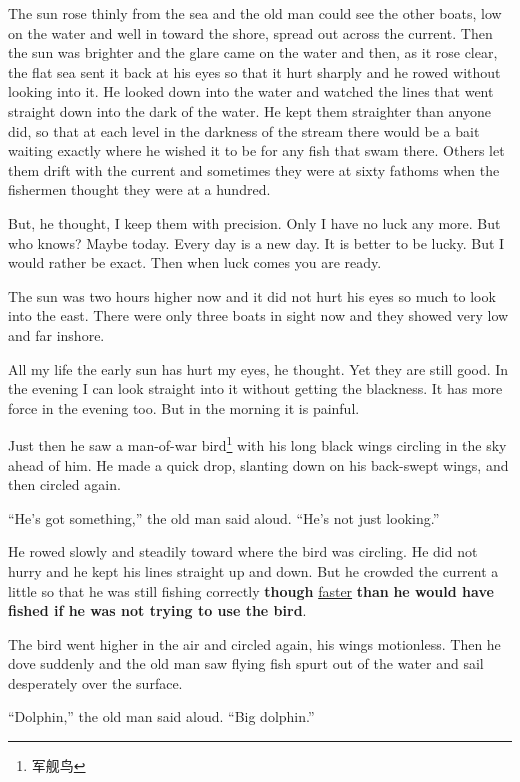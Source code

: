 \documentclass[fontset=ubuntu]{ctexrep}
\newlength{\drop}%
\begin{document}
The sun rose \gls{thinly} from the sea and the old man could see the other boats,
low on the water and well in \gls{toward} the \gls{shore}, spread out across the
current. Then the sun was brighter and the \gls{glare} came on the water and
then, as it rose clear, the \gls{flat} sea sent it back at his eyes so that it
hurt \gls{sharply} and he rowed without looking into it. He looked down into the
water and watched the lines that went straight down into the dark of the
water. He kept them straighter than anyone did, so that at each level in
the darkness of the stream there would be a bait waiting exactly where he
wished it to be for any fish that swam there. Others let them drift with
the current and sometimes they were at sixty fathoms when the fishermen
thought they were at a hundred.

But, he thought, I keep them with \gls{precision}. Only I have no luck any more.
But who knows? Maybe today. Every day is a new day. It is better to be
lucky. But I would rather be exact. Then when luck comes you are ready.

The sun was two hours higher now and it did not hurt his eyes so much to
look into the east. There were only three boats in \gls{sight} now and they
showed very low and far \gls{inshore}.

All my life the early sun has hurt my eyes, he thought. Yet they are still
good. In the evening I can look straight into it without getting the
blackness. It has more \gls{force} in the evening too. But in the morning it is
\gls{painful}.

Just then he saw a man-of-war bird\footnote{军舰鸟} with his long black
wings circling in the sky \gls{ahead} of him. He made a quick drop,
\gls{slanting} down on his back-swept wings, and then circled again.

``He's got something,'' the old man said aloud. ``He's not just looking.''

He rowed slowly and steadily toward where the bird was circling. He did not
hurry and he kept his lines straight up and down. But he \gls{crowded} the
current a little so that he was still fishing correctly \textbf{though}
\uline{faster} \textbf{than} \textbf{he would have fished if he was not trying
  to use the bird}.

The bird went higher in the air and circled again, his wings
\gls{motionless}. Then he \gls{dove} suddenly and the old man saw flying
fish \gls{spurt} out of the water and sail \gls{desperately} over the surface.

``Dolphin,'' the old man said aloud. ``Big dolphin.''
\end{document}
